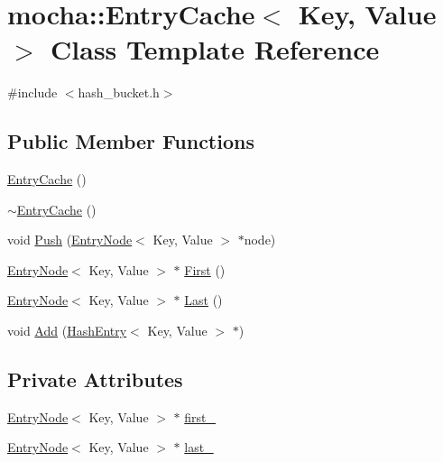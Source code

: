 \hypertarget{classmocha_1_1_entry_cache}{
\section{mocha::EntryCache$<$ Key, Value $>$ Class Template Reference}
\label{classmocha_1_1_entry_cache}
}


{\ttfamily \#include $<$hash\_\-bucket.h$>$}

\subsection*{Public Member Functions}
\begin{DoxyCompactItemize}
\item 
\hyperlink{classmocha_1_1_entry_cache_ab21861a2ddd25db3c68201b1b0de135c}{EntryCache} ()
\item 
\hyperlink{classmocha_1_1_entry_cache_a9605bada8f5f97ff2658d59e2a39ccc5}{$\sim$EntryCache} ()
\item 
void \hyperlink{classmocha_1_1_entry_cache_adcf78de7389baa427b0a9fd03c0f6e5d}{Push} (\hyperlink{classmocha_1_1_entry_node}{EntryNode}$<$ Key, Value $>$ $\ast$node)
\item 
\hyperlink{classmocha_1_1_entry_node}{EntryNode}$<$ Key, Value $>$ $\ast$ \hyperlink{classmocha_1_1_entry_cache_a805d3466e50a2ecadd56f2085398bf13}{First} ()
\item 
\hyperlink{classmocha_1_1_entry_node}{EntryNode}$<$ Key, Value $>$ $\ast$ \hyperlink{classmocha_1_1_entry_cache_a31ef38338d1dc53759bf56533c942d3f}{Last} ()
\item 
void \hyperlink{classmocha_1_1_entry_cache_a98990a86924aa2a218adc00b400e4fbc}{Add} (\hyperlink{classmocha_1_1_hash_entry}{HashEntry}$<$ Key, Value $>$ $\ast$)
\end{DoxyCompactItemize}
\subsection*{Private Attributes}
\begin{DoxyCompactItemize}
\item 
\hyperlink{classmocha_1_1_entry_node}{EntryNode}$<$ Key, Value $>$ $\ast$ \hyperlink{classmocha_1_1_entry_cache_a670849af1e3ac7263915ae9d17ebc5a9}{first\_\-}
\item 
\hyperlink{classmocha_1_1_entry_node}{EntryNode}$<$ Key, Value $>$ $\ast$ \hyperlink{classmocha_1_1_entry_cache_a96a090725b7deff93ae5234645edd8e5}{last\_\-}
\end{DoxyCompactItemize}


